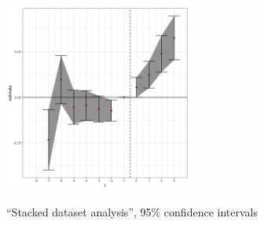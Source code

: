 \documentclass{beamer}
\begin{document}
\begin{frame}[label=stacked_analysis, noframenumbering]%
\begin{figure}[H]
\centering
\caption{``Stacked dataset analysis'', 95\% confidence intervals} 
\label{fig:stacked_wcontrols}
      
\includegraphics[width=0.55\textwidth]{Figures_pres/stacked_dataset_wcontrols.png}
       \captionsetup{justification=centering}
 \\ 
  \hyperlink{event_by_event_figure}{}     \hyperlink{identification2}{}   

 
\end{figure}   
 
\end{frame}
\end{document}
